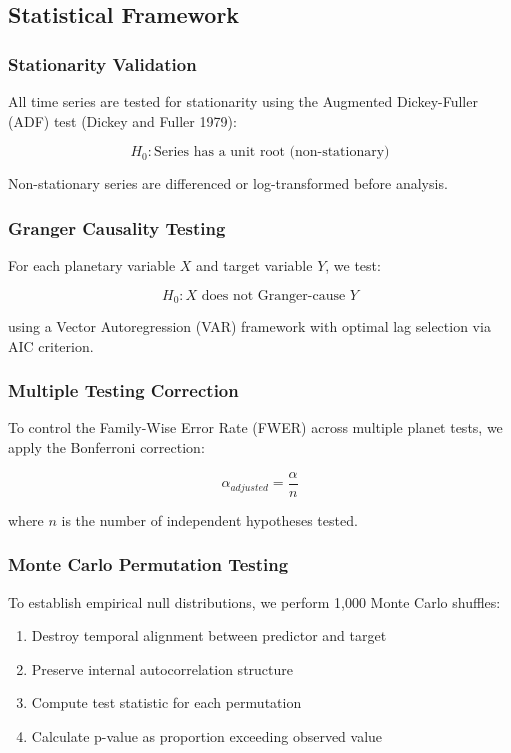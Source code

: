 \documentclass[
  11pt,
  a4paper,
  oneside,
  openany]{article}
\providecommand{\tightlist}{%
  \setlength{\itemsep}{0pt}\setlength{\parskip}{0pt}}\usepackage{longtable,booktabs,array}
\begin{document}
\subsection{Statistical Framework}\label{statistical-framework}

\subsubsection{Stationarity Validation}\label{stationarity-validation}

All time series are tested for stationarity using the Augmented
Dickey-Fuller (ADF) test (Dickey and Fuller 1979):

\[
H_0: \text{Series has a unit root (non-stationary)}
\]

Non-stationary series are differenced or log-transformed before
analysis.

\subsubsection{Granger Causality
Testing}\label{granger-causality-testing}

For each planetary variable \(X\) and target variable \(Y\), we test:

\[
H_0: X \text{ does not Granger-cause } Y
\]

using a Vector Autoregression (VAR) framework with optimal lag selection
via AIC criterion.

\subsubsection{Multiple Testing
Correction}\label{multiple-testing-correction}

To control the Family-Wise Error Rate (FWER) across multiple planet
tests, we apply the Bonferroni correction:

\[
\alpha_{adjusted} = \frac{\alpha}{n}
\]

where \(n\) is the number of independent hypotheses tested.

\subsubsection{Monte Carlo Permutation
Testing}\label{monte-carlo-permutation-testing}

To establish empirical null distributions, we perform 1,000 Monte Carlo
shuffles:

\begin{enumerate}
\def\labelenumi{\arabic{enumi}.}
\tightlist
\item
  Destroy temporal alignment between predictor and target
\item
  Preserve internal autocorrelation structure
\item
  Compute test statistic for each permutation
\item
  Calculate p-value as proportion exceeding observed value
\end{enumerate}
\end{document}
